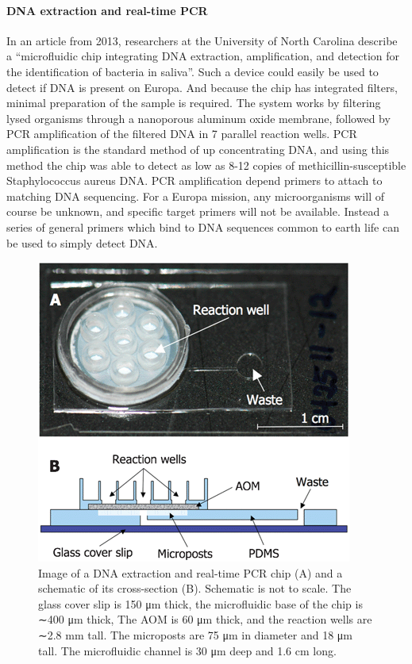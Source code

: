 \paragraph{DNA extraction and real-time PCR \cite{Oblath2013}}
In an article from 2013, researchers at the University of North Carolina describe a “microfluidic chip integrating DNA extraction, amplification, and detection for the identification of bacteria in saliva”. Such a device could easily be used to detect if DNA is present on Europa. And because the chip has integrated filters, minimal preparation of the sample is required. The system works by filtering lysed organisms through a nanoporous aluminum oxide membrane, followed by PCR amplification of the filtered DNA in 7 parallel reaction wells. PCR amplification is the standard method of up concentrating DNA, and using this method the chip was able to detect as low as 8-12 copies of methicillin-susceptible Staphylococcus aureus DNA. PCR amplification depend primers to attach to matching DNA sequencing. For a Europa mission, any microorganisms will of course be unknown, and specific target primers will not be available. Instead a series of general primers which bind to DNA sequences common to earth life can be used to simply detect DNA. 
\begin{figure}[htb]
	\centering
	\includegraphics[width=\textwidth]{figures/mlh/reactionwells.png}
	\caption{Image of a DNA extraction and real-time PCR chip (A) and a schematic of its cross-section (B). Schematic is not to scale. The glass cover slip is 150 μm thick, the microfluidic base of the chip is ∼400 μm thick, The AOM is 60 μm thick, and the reaction wells are ∼2.8 mm tall. The microposts are 75 μm in diameter and 18 μm tall. The microfluidic channel is 30 μm deep and 1.6 cm long. \cite{Oblath2013}}
	\label{fig:DNAPCRchip}
\end{figure}

